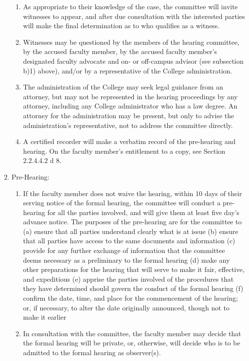 \documentclass[letterpaper, 11pt]{article}
\begin{document}
\begin{enumerate}[label=\alph*)]
{\begin{enumerate}[label=\arabic*)]
							\item{As appropriate to their knowledge of the case, the committee will invite witnesses to appear, and after due consultation with the interested parties will make the final determination as to who qualifies as a witness.}
							\item{Witnesses may be questioned by the members of the hearing committee, by the accused faculty member, by the accused faculty member's designated faculty advocate and on- or off-campus advisor (see subsection b)1) above), and/or by a representative of the College administration.}
							\item{The administration of the College may seek legal guidance from an attorney, but may not be represented in the hearing proceedings by any attorney, including any College administrator who has a law degree.  An attorney for the administration may be present, but only to advise the administration's representative, not to address the committee directly.}
							\item{A certified recorder will make a verbatim record of the pre-hearing and hearing.
								On the faculty member's entitlement to a copy, see Section 2.2.4.4.2 d 8. }
						\end{enumerate}
					}
					\item{Pre-Hearing:
						\begin{enumerate}[label=\arabic*)]
							\item{If the faculty member does not waive the hearing, within 10 days of their serving notice of the formal hearing, the committee will conduct a pre-hearing for all the parties involved, and will give them at least five day's advance notice.  The purposes of the pre-hearing are for the committee to}
							(a) ensure that all parties understand clearly what is at issue
							(b) ensure that all parties have access to the same documents and information
							(c) provide for any further exchange of information that the committee deems necessary as a preliminary to the formal hearing
							(d) make any other preparations for the hearing that will serve to make it fair, effective, and expeditious
							(e) apprise the parties involved of the procedures that they have determined should govern the conduct of the formal hearing
							(f) confirm the date, time, and place for the commencement of the hearing; or, if necessary, to alter the date originally announced, though not to make it earlier
							\item{In consultation with the committee, the faculty member may decide that the formal hearing will be private, or, otherwise, will decide who is to be admitted to the formal hearing as observer(s).}

\end{enumerate}}
\end{enumerate}
\end{document}
